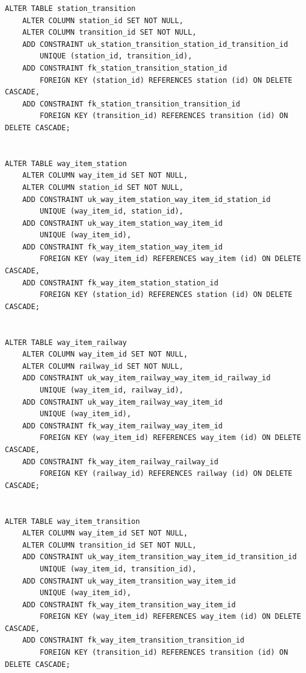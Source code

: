 \clearpage

\begin{lstlisting}[label=lst:cnst3,caption=Запросы для создания ограничений таблиц (часть 3)]
ALTER TABLE station_transition
    ALTER COLUMN station_id SET NOT NULL,
    ALTER COLUMN transition_id SET NOT NULL,
    ADD CONSTRAINT uk_station_transition_station_id_transition_id
        UNIQUE (station_id, transition_id),
    ADD CONSTRAINT fk_station_transition_station_id
        FOREIGN KEY (station_id) REFERENCES station (id) ON DELETE CASCADE,
    ADD CONSTRAINT fk_station_transition_transition_id
        FOREIGN KEY (transition_id) REFERENCES transition (id) ON DELETE CASCADE;


ALTER TABLE way_item_station
    ALTER COLUMN way_item_id SET NOT NULL,
    ALTER COLUMN station_id SET NOT NULL,
    ADD CONSTRAINT uk_way_item_station_way_item_id_station_id
        UNIQUE (way_item_id, station_id),
    ADD CONSTRAINT uk_way_item_station_way_item_id
        UNIQUE (way_item_id),
    ADD CONSTRAINT fk_way_item_station_way_item_id
        FOREIGN KEY (way_item_id) REFERENCES way_item (id) ON DELETE CASCADE,
    ADD CONSTRAINT fk_way_item_station_station_id
        FOREIGN KEY (station_id) REFERENCES station (id) ON DELETE CASCADE;


ALTER TABLE way_item_railway
    ALTER COLUMN way_item_id SET NOT NULL,
    ALTER COLUMN railway_id SET NOT NULL,
    ADD CONSTRAINT uk_way_item_railway_way_item_id_railway_id
        UNIQUE (way_item_id, railway_id),
    ADD CONSTRAINT uk_way_item_railway_way_item_id
        UNIQUE (way_item_id),
    ADD CONSTRAINT fk_way_item_railway_way_item_id
        FOREIGN KEY (way_item_id) REFERENCES way_item (id) ON DELETE CASCADE,
    ADD CONSTRAINT fk_way_item_railway_railway_id
        FOREIGN KEY (railway_id) REFERENCES railway (id) ON DELETE CASCADE;


ALTER TABLE way_item_transition
    ALTER COLUMN way_item_id SET NOT NULL,
    ALTER COLUMN transition_id SET NOT NULL,
    ADD CONSTRAINT uk_way_item_transition_way_item_id_transition_id
        UNIQUE (way_item_id, transition_id),
    ADD CONSTRAINT uk_way_item_transition_way_item_id
        UNIQUE (way_item_id),
    ADD CONSTRAINT fk_way_item_transition_way_item_id
        FOREIGN KEY (way_item_id) REFERENCES way_item (id) ON DELETE CASCADE,
    ADD CONSTRAINT fk_way_item_transition_transition_id
        FOREIGN KEY (transition_id) REFERENCES transition (id) ON DELETE CASCADE;
\end{lstlisting}

\clearpage

